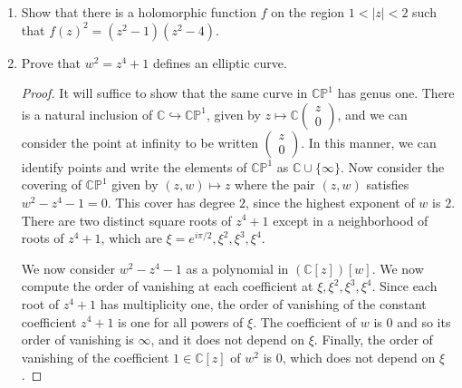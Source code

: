 \documentclass{article}
\begin{document}
\begin{enumerate}
\item Show that there is a holomorphic function $f$ on the region $1 < |z| < 2$ such that $f(z)^2 = (z^2-1)(z^2-4)$.



\item Prove that $w^2 = z^4 +1$ defines an elliptic curve.

\begin{proof} It will suffice to show that the same curve in $\mathbb{CP}^1$ has genus one.
There is a natural inclusion of $ \mathbb{C} \hookrightarrow \mathbb{CP}^1$, given by $z \mapsto \mathbb{C}\begin{pmatrix} z \\ 0 \end{pmatrix}$, and we can consider the point at infinity to be written $\begin{pmatrix}z \\ 0 \end{pmatrix}$. In this manner, we can identify points and write the elements of $\mathbb{CP}^1$ as 
$\mathbb{C} \cup \{ \infty\}$.
Now consider the covering of $\mathbb{CP}^1$ given by $(z,w) \mapsto z$ where the pair $(z,w)$ satisfies
$w^2 - z^4 -1 = 0$. This cover has degree $2$, since the highest exponent of $w$ is $2$.
There are two distinct square roots of $z^4+1$ except in a neighborhood of roots of $z^4+1$, which are
$\xi = e^{i \pi /2}, \xi^2,\xi^3,\xi^4$.


We now consider $w^2 - z^4-1$ as a polynomial in $(\mathbb{C}[z])[w]$. We now compute the order of vanishing at each 
coefficient at $\xi,\xi^2,\xi^3,\xi^4$. Since each root of $z^4+1$ has multiplicity one, the order of vanishing of the constant
coefficient $z^4+1$ is one for all powers of $\xi$. The coefficient of $w$ is $0$ and so its order of vanishing is $\infty$, and it does not depend on $\xi$. Finally, the order of vanishing of the coefficient $1 \in \mathbb{C}[z]$ of $w^2$ is $0$, which does not depend on $\xi$.


\end{proof}
\end{enumerate}
\end{document}
